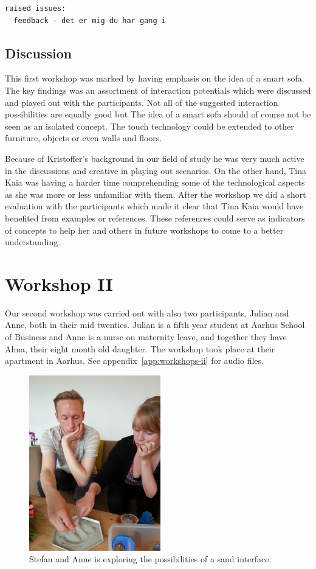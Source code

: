 \begin{verbatim}
raised issues:
  feedback - det er mig du har gang i
\end{verbatim}

\subsection{Discussion}
\label{ch:workshops:workshop-i:discussion}

This first workshop was marked by having emphasis on the idea of a smart sofa.
The key findings was an assortment of interaction potentials which were discussed and played out with the participants.
Not all of the suggested interaction possibilities are equally good but \todo{\dots}
The idea of a smart sofa should of course not be seen as an isolated concept.
The touch technology could be extended to other furniture, objects or even walls and floors.

Because of Kristoffer's background in our field of study he was very much active in the discussions and creative in playing out scenarios.
On the other hand, Tina Kaia was having a harder time comprehending some of the technological aspects as she was more or less unfamiliar with them.
After the workshop we did a short evaluation with the participants which made it clear that Tina Kaia would have benefited from examples or references.
These references could serve as indicators of concepts to help her and others in future workshops to come to a better understanding.

\section{Workshop II}
\label{ch:workshops:workshop-ii}
Our second workshop was carried out with also two participants, Julian and Anne, both in their mid twenties.
Julian is a fifth year student at Aarhus School of Business and Anne is a nurse on maternity leave, and together they have Alma, their eight month old daughter.
The workshop took place at their apartment in Aarhus.
See appendix~\ref{app:workshops-ii} for  audio files.

\begin{figure}[h]
  \centering
      \includegraphics[height=3in]{figures/stefan_anne}
  \caption{Stefan and Anne is exploring the possibilities of a sand interface.}
   \label{stefan_anne}
\end{figure}

